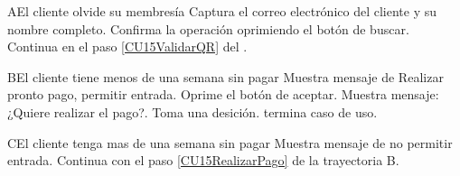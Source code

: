 		\begin{UCtrayectoriaA}{A}{El cliente olvide su membresía}
			\UCpaso[\UCactor] Captura el correo electrónico del cliente y su nombre completo.%
			\UCpaso[\UCactor] Confirma la operación oprimiendo el botón de buscar.%
			\UCpaso Continua en el paso \ref{CU15ValidarQR} del .
		\end{UCtrayectoriaA}
		
		\begin{UCtrayectoriaA}{B}{El cliente tiene menos de una semana sin pagar}
			\UCpaso Muestra mensaje de Realizar pronto pago, permitir entrada.
			\UCpaso[\UCactor] Oprime el botón de aceptar.%
			\UCpaso Muestra mensaje: ¿Quiere realizar el pago?.
			\UCpaso[\UCactor] Toma una desición.
			\UCpaso[] termina caso de uso.
		\end{UCtrayectoriaA}

		\begin{UCtrayectoriaA}{C}{El cliente tenga mas de una semana sin pagar}
			\UCpaso Muestra mensaje de no permitir entrada.%
			\UCpaso[\UCactor] Continua con el paso \ref{CU15RealizarPago} de la trayectoria B.
		\end{UCtrayectoriaA}



